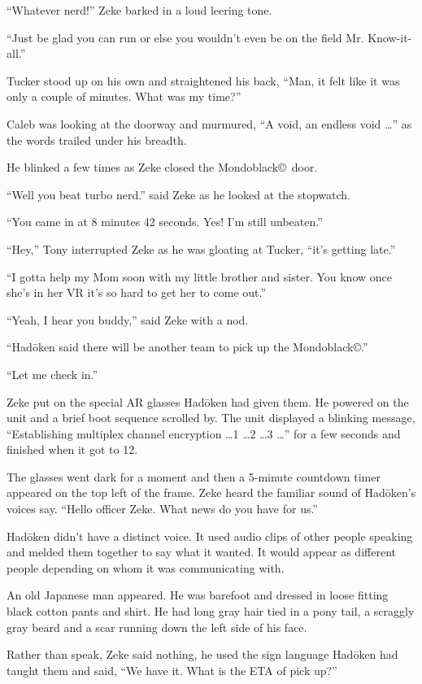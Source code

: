 ``Whatever nerd!'' Zeke barked in a loud leering tone.

``Just be glad you can run or else you wouldn't even be on the
field Mr. Know-it-all.''

Tucker stood up on his own and straightened his back,
``Man, it felt like it was only a couple of minutes. What was my
time?''

Caleb was looking at the doorway and murmured, ``A void, an
endless void \ldots '' as the words trailed under his breadth.

He blinked a few times as Zeke closed the
Mondoblack\copyright\ door.

``Well you beat turbo nerd.'' said Zeke as he looked at the
stopwatch.

``You came in at 8 minutes 42 seconds. Yes! I'm still
unbeaten.''

``Hey,''  Tony interrupted Zeke as he was gloating at Tucker,
``it's getting late.''

``I gotta help my Mom soon with my little brother and sister.
You know once she's in her VR it's so hard to get her to come
out.''

``Yeah, I hear you buddy,'' said Zeke with a nod.

``Had\={o}ken said there will be another team to pick up the
Mondoblack\copyright.''

``Let me check in.''

Zeke put on the special AR glasses Had\={o}ken had given them.
He powered on the unit and a brief boot sequence scrolled by.
The unit displayed a blinking message, ``Establishing multiplex
channel encryption \ldots 1 \ldots 2 \ldots 3 \ldots'' for a few
seconds and finished when it got to 12.

The glasses went dark for a moment and then a 5-minute countdown
timer appeared on the top left of the frame. Zeke heard the
familiar sound of Had\={o}ken's voices say. ``Hello officer
Zeke. What news do you have for us.''

Had\={o}ken didn't have a distinct voice. It used audio clips of
other people speaking and melded them together to say what it
wanted. It would appear as different people depending on whom it
was communicating with.

An old Japanese man appeared. He was barefoot and dressed in
loose fitting black cotton pants and shirt. He had long gray
hair tied in a pony tail, a scraggly gray beard and a scar
running down the left side of his face.

Rather than speak, Zeke said nothing, he used the sign
language Had\={o}ken had taught them and said, ``We have
it. What is the ETA of pick up?''

